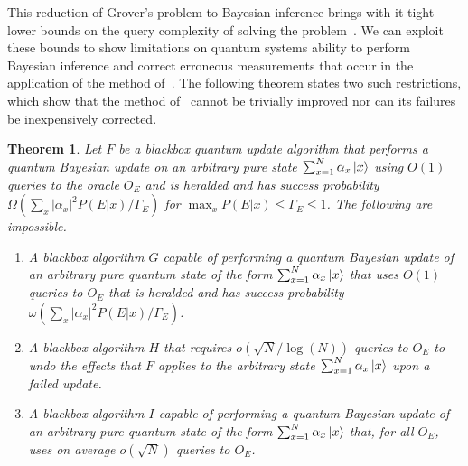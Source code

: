 \documentclass[aps,amsmath,onecolumn,amssymb,notitlepage]{revtex4-1}
\newtheorem{theorem}{Theorem}
\begin{document}
This reduction of Grover's problem to Bayesian inference brings with it tight lower bounds on the query complexity of solving the problem~\cite{BGH+96}.  We can exploit these bounds to show limitations on quantum systems ability to perform Bayesian inference and correct erroneous measurements that occur in the application of the method of~.  The following theorem states two such restrictions, which show that the method of~ cannot be trivially improved nor can its failures be inexpensively corrected. 
\begin{theorem}
Let $F$ be a blackbox quantum update algorithm that performs a quantum Bayesian update on an arbitrary pure state $\sum_{x=1}^N \alpha_x \left|x\right\rangle$ using $O(1)$ queries to the oracle $O_E$ and is heralded and has success probability $\Omega({\sum_x |\alpha_x|^2 P(E|x)/\Gamma_E})$ for $\max_x P(E|x)\le \Gamma_E\le 1$.  The following are impossible.
\begin{enumerate}
\item A blackbox algorithm $G$ capable of performing a quantum Bayesian update of an arbitrary pure quantum state of the form $\sum_{x=1}^N \alpha_x \left|x\right\rangle$ that uses $O(1)$ queries to $O_E$ that is heralded and has  success probability $\omega({\sum_x |\alpha_x|^2 P(E|x)/\Gamma_E})$.
\item A blackbox algorithm $H$ that requires $o(\sqrt{N}/\log(N))$ queries to $O_E$ to undo the effects that $F$ applies to the arbitrary state $\sum_{x=1}^N \alpha_x \left|x\right\rangle$ upon a failed update.
\item A blackbox algorithm $I$ capable of performing a quantum Bayesian update of an arbitrary pure quantum state of the form $\sum_{x=1}^N \alpha_x \left|x\right\rangle$ that, for all $O_E$, uses on average $o(\sqrt{N})$ queries to $O_E$.
\end{enumerate}
\end{theorem}
\end{document}
